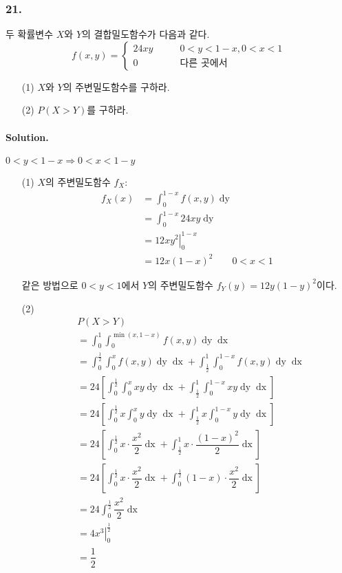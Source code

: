\subsubsection{21.} 두 확률변수 $X$와 $Y$의 결합밀도함수가 다음과 같다.
\[f\left(x, y\right) = \left\{
\begin{array}{ll}
	24xy & \qquad 0<y<1-x, 0<x<1 \\
	0 & \qquad\textrm{다른 곳에서}
\end{array}
\right. \]
\begin{itemize}
  \item [(1)] $X$와 $Y$의 주변밀도함수를 구하라.
  \item [(2)] $P\left(X>Y\right)$를 구하라.
\end{itemize}

\paragraph{Solution.} $0<y<1-x \Rightarrow 0<x<1-y$
\begin{itemize}
  \item [(1)] $X$의 주변밀도함수 $f_X$:
\begin{align*}
	f_X\left(x\right) &= \int_0^{1-x} f\left(x, y\right) \mathop{dy} \\
	&= \int_0^{1-x} 24xy \mathop{dy} \\
	&= \left. 12xy^2 \right|_0^{1-x} \\
	&= 12x\left(1-x\right)^2 \qquad 0<x<1
\end{align*}

같은 방법으로 $0<y<1$에서 $Y$의 주변밀도함수 $f_Y\left(y\right) = 12y\left(1-y\right)^2$이다.

  \item [(2)]
\begin{align*}
	& P\left(X>Y\right) \\
	&= \int_0^1 \int_0^{\mathop{\mathrm{min}}\left(x, 1-x\right)} f\left(x, y\right) \mathop{dy} \mathop{dx}\\
	&= \int_0^{\frac{1}{2}} \int_0^{x} f\left(x, y\right) \mathop{dy} \mathop{dx} + \int_{\frac{1}{2}}^1 \int_0^{1 - x} f\left(x, y\right) \mathop{dy} \mathop{dx}\\
	&= 24 \left[ \int_0^{\frac{1}{2}} \int_0^{x} xy \mathop{dy} \mathop{dx} + \int_{\frac{1}{2}}^1 \int_0^{1 - x} xy \mathop{dy} \mathop{dx} \right]\\
	&= 24 \left[ \int_0^{\frac{1}{2}} x \int_0^{x} y \mathop{dy} \mathop{dx} + \int_{\frac{1}{2}}^1 x \int_0^{1 - x} y \mathop{dy} \mathop{dx} \right]\\
	&= 24 \left[ \int_0^{\frac{1}{2}} x\cdot\dfrac{x^2}{2} \mathop{dx} + \int_{\frac{1}{2}}^1 x\cdot\dfrac{\left(1 - x\right)^2}{2} \mathop{dx} \right]\\
	&= 24 \left[ \int_0^{\frac{1}{2}} x\cdot\dfrac{x^2}{2} \mathop{dx} + \int_0^{\frac{1}{2}} \left(1 - x\right)\cdot\dfrac{x^2}{2} \mathop{dx} \right]\\
	&= 24 \int_0^{\frac{1}{2}} \dfrac{x^2}{2} \mathop{dx}\\
	&= 4 \left.x^3\right|_0^{\frac{1}{2}}\\
	&= \dfrac{1}{2}
\end{align*}
\end{itemize}

